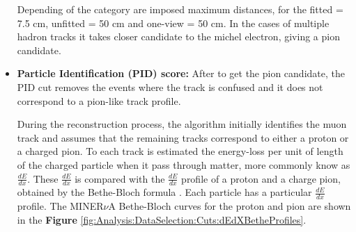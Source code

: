 \begin{itemize}
    Depending of the category are imposed maximum distances, for the fitted = 7.5 cm, unfitted = 50 cm and one-view = 50 cm. In the cases of multiple hadron tracks it takes closer candidate to the michel electron, giving a pion candidate.
    \item \textbf{Particle Identification (PID) score:} After to get the pion candidate, the PID cut removes the events where the track is confused and it does not correspond to a pion-like track profile.
    
    During the reconstruction process, the algorithm initially identifies the muon track and assumes that the remaining tracks correspond to either a proton or a charged pion. To each track is estimated the energy-loss per unit of length of the charged particle when it pass through matter, more commonly know as $\frac{dE}{dx}$. These $\frac{dE}{dx}$ is compared with the $\frac{dE}{dx}$ profile of a proton and a charge pion, obtained by the Bethe-Bloch formula \cite{DetectionTechniques}. Each particle has a particular $\frac{dE}{dx}$ profile. The MINER$\nu$A Bethe-Bloch curves for the proton and pion are shown in the \textbf{Figure} \ref{fig:Analysis:DataSelection:Cuts:dEdXBetheProfiles}. 



\end{itemize}
